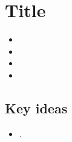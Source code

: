 \section{Title}

\cite{}

\begin{itemize}
  \item[Author]
  \item[Keywords]
  \item[Technics]
  \item[Isotopes]
\end{itemize}

\subsection*{Key ideas}
\begin{itemize}
  \item .
\end{itemize}
